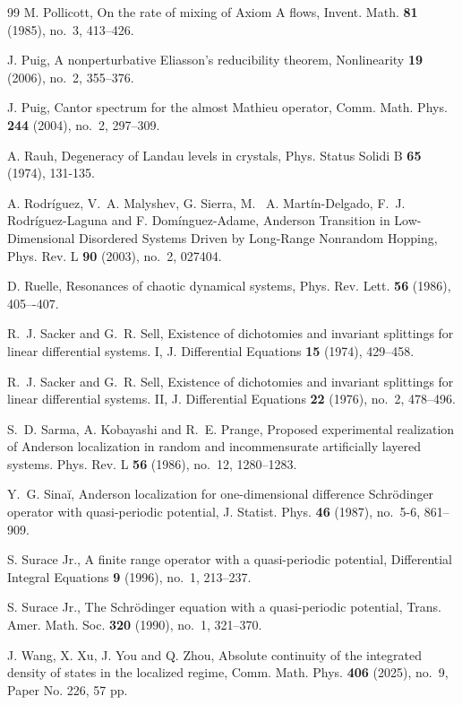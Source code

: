 \documentclass[reqno,11pt]{amsart}
\begin{document}
\begin{thebibliography}{99}
M. Pollicott, On the rate of mixing of Axiom A flows, Invent. Math. {\bf 81} (1985), no.~3, 413--426.

J. Puig, A nonperturbative Eliasson's reducibility theorem, Nonlinearity {\bf 19} (2006), no.~2, 355--376.

J. Puig, Cantor spectrum for the almost Mathieu operator, Comm. Math. Phys. {\bf 244} (2004), no.~2, 297--309.




A. Rauh, Degeneracy of Landau levels in crystals,  Phys. Status Solidi B {\bf 65} (1974), 131-135.


A. Rodr\'iguez, V.~A. Malyshev, G. Sierra, M. ~A. Mart\'in-Delgado, F.~J. Rodr\'iguez-Laguna and  F. Dom\'inguez-Adame,  Anderson Transition in Low-Dimensional Disordered Systems Driven by Long-Range Nonrandom Hopping, Phys. Rev. L {\bf 90} (2003), no.~2, 027404.

D. Ruelle, Resonances of chaotic dynamical systems, Phys. Rev. Lett. {\bf 56}  (1986), 405–-407.

R.~J. Sacker and G.~R. Sell, Existence of dichotomies and invariant splittings for linear differential systems. I, J. Differential Equations {\bf 15} (1974), 429--458.

R.~J. Sacker and G.~R. Sell, Existence of dichotomies and invariant splittings for linear differential systems. II, J. Differential Equations {\bf 22} (1976), no.~2, 478--496.


S.~D. Sarma, A. Kobayashi and R.~E. Prange, Proposed experimental realization of Anderson localization in random and incommensurate artificially layered systems. Phys. Rev. L {\bf 56} (1986), no.~12, 1280--1283.


Y.~G. Sina\u i, Anderson localization for one-dimensional difference Schr\"odinger operator with quasi-periodic potential, J. Statist. Phys. {\bf 46} (1987), no.~5-6, 861--909.




S. Surace Jr., A finite range operator with a quasi-periodic potential, Differential Integral Equations {\bf 9} (1996), no.~1, 213--237.


S. Surace Jr., The Schr\"odinger equation with a quasi-periodic potential, Trans. Amer. Math. Soc. {\bf 320} (1990), no.~1, 321--370.

J. Wang, X. Xu, J. You and Q. Zhou, Absolute continuity of the integrated density of states in the localized regime, Comm. Math. Phys. {\bf 406} (2025), no.~9, Paper No. 226, 57 pp.


\end{thebibliography}
\end{document}
